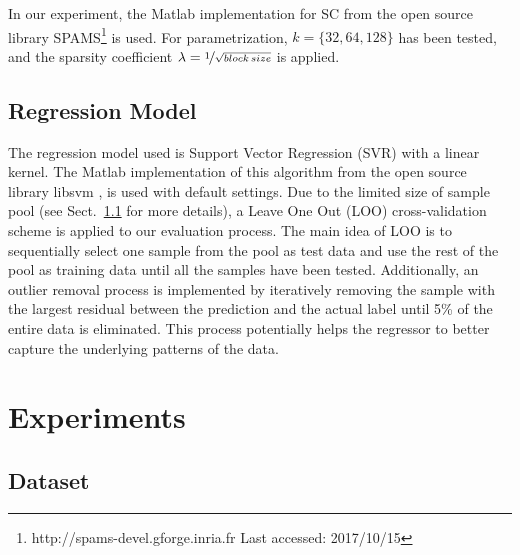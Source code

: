 \documentclass[conference]{IEEEtran}
\begin{document}
In our experiment, the Matlab implementation for SC from the open source library SPAMS\footnote{http://spams-devel.gforge.inria.fr Last accessed: 2017/10/15}\cite{Mairal2009a} is used. For parametrization, $k = \{32, 64, 128\}$ has been tested, and the sparsity coefficient $\lambda = \nicefrac{1}{\sqrt{block\, size}}$ is applied. 

\subsection{Regression Model}
The regression model used is Support Vector Regression (SVR) with a linear kernel. The Matlab implementation of this algorithm from the  open source library  libsvm \cite{Chang2011}, is used with default settings. Due to the limited size of sample pool (see Sect.~\ref{subsec:dataset} for more details), a Leave One Out (LOO) cross-validation scheme is applied to our evaluation process. The main idea of LOO is to sequentially select one sample from the pool as test data and use the rest of the pool as training data until all the samples have been tested. Additionally, an outlier removal process is implemented by iteratively removing the sample with the largest residual between the prediction and the actual label until 5\% of the entire data is eliminated. This process potentially helps the regressor to better capture the underlying patterns of the data.  

\section{Experiments}\label{sec:experiments}
\subsection{Dataset}\label{subsec:dataset}
\end{document}
